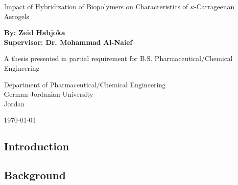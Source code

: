 \documentclass[a4paper,12pt]{article}
\begin{document}

\begin{titlepage}
  \begin{center}
  
    \vspace*{1 in} 
    
    \Large Impact of Hybridization of Biopolymers on Characteristics of $\kappa$-Carrageenan Aerogels \\
    
    \vspace*{1 in} 
    
    \large \textbf{By: Zeid Habjoka} \\
    \large \textbf{Supervisor: Dr. Mohammad Al-Naief} \\
    
    \vspace*{1 in} 
    
    \large A thesis presented in partial requirement for B.S. Pharmaceutical/Chemical Engineering \\
    
    \vspace*{1 in}
    
    \large Department of Pharmaceutical/Chemical Engineering \\
    \large German-Jordanian University \\
    \large Jordan \\
    
    \vspace*{1 in}
    
    \large \today
    
    \vfill
    
  \end{center}
\end{titlepage}

\newpage

\tableofcontents

\vfill

\newpage
  

\begin{center}
  \section{Introduction}
\end{center}

\subsection{Background}
\end{document}
